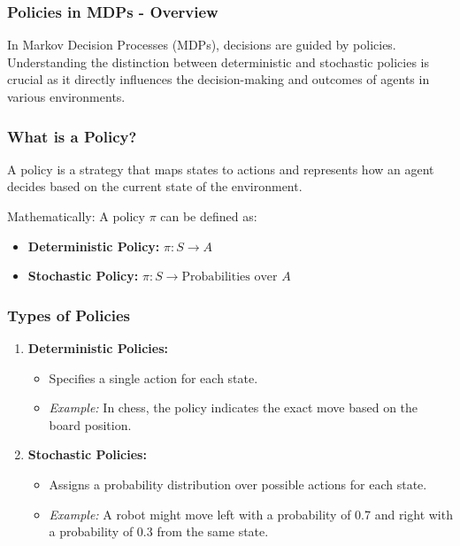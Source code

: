 \documentclass[aspectratio=169]{beamer}
\begin{document}
\begin{frame}[fragile]
    \frametitle{Policies in MDPs - Overview}
    In Markov Decision Processes (MDPs), decisions are guided by policies. Understanding the distinction between deterministic and stochastic policies is crucial as it directly influences the decision-making and outcomes of agents in various environments.
\end{frame}

\begin{frame}[fragile]
    \frametitle{What is a Policy?}
    A policy is a strategy that maps states to actions and represents how an agent decides based on the current state of the environment.
    
    \begin{block}{Mathematically:}
        A policy \( \pi \) can be defined as:
        \begin{itemize}
            \item \textbf{Deterministic Policy:} \( \pi: S \rightarrow A \)
            \item \textbf{Stochastic Policy:} \( \pi: S \rightarrow \text{Probabilities over } A \)
        \end{itemize}
    \end{block}
\end{frame}

\begin{frame}[fragile]
    \frametitle{Types of Policies}
    \begin{enumerate}
        \item \textbf{Deterministic Policies:}
        \begin{itemize}
            \item Specifies a single action for each state.
            \item \textit{Example:} In chess, the policy indicates the exact move based on the board position.
        \end{itemize}

        \item \textbf{Stochastic Policies:}
        \begin{itemize}
            \item Assigns a probability distribution over possible actions for each state.
            \item \textit{Example:} A robot might move left with a probability of 0.7 and right with a probability of 0.3 from the same state.
        \end{itemize}
    \end{enumerate}
\end{frame}
\end{document}

